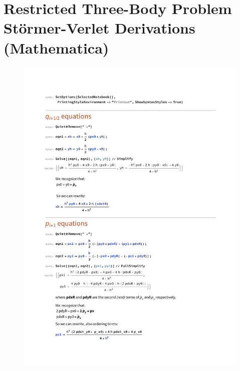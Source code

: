 \section{Restricted Three-Body Problem Störmer-Verlet Derivations (Mathematica)} \label{app:r3b-verlet}
\begin{figure}[h!]
\centering 
\includegraphics[scale=0.60]{appendices/Miscellaneous/R3B_Verlet_derivations.pdf}
\end{figure}


\clearpage

